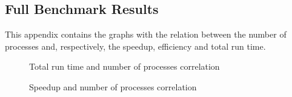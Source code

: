 \subsection{Full Benchmark Results}

This appendix contains the graphs with the relation between the number of processes and, respectively, the speedup, efficiency and total run time.

\begin{figure}[!ht]
    \centering
    \begin{subfigure}{0.4\linewidth}
        
    \end{subfigure}
    \begin{subfigure}{0.4\linewidth}
        
    \end{subfigure}
    \begin{subfigure}{0.4\linewidth}
        
    \end{subfigure}
    \begin{subfigure}{0.4\linewidth}
        
    \end{subfigure}
    \caption{Total run time and number of processes correlation}
    \label{fig:exec_time}
\end{figure}

\begin{figure}[!ht]
    \centering
    \begin{subfigure}{0.4\linewidth}
        
    \end{subfigure}
    \begin{subfigure}{0.4\linewidth}
        
    \end{subfigure}
    \begin{subfigure}{0.4\linewidth}
        
    \end{subfigure}
    \begin{subfigure}{0.4\linewidth}
        
    \end{subfigure}
    \caption{Speedup and number of processes correlation}
    \label{fig:speedup}
\end{figure}

